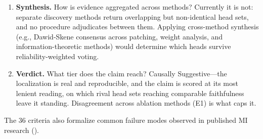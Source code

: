 \documentclass{article}
\begin{document}
\begin{enumerate}[nosep]
\item \textbf{Synthesis.} How is evidence aggregated across methods? Currently it is not: separate discovery methods return overlapping but non-identical head sets, and no procedure adjudicates between them. Applying cross-method synthesis (e.g., Dawid-Skene consensus across patching, weight analysis, and information-theoretic methods) would determine which heads survive reliability-weighted voting.

\item \textbf{Verdict.} What tier does the claim reach? Causally Suggestive---the localization is real and reproducible, and the claim is scored at its most lenient reading, on which rival head sets reaching comparable faithfulness leave it standing. Disagreement across ablation methods (E1) is what caps it.
\end{enumerate}

The 36 criteria also formalize common failure modes observed in published MI research ().
\end{document}
